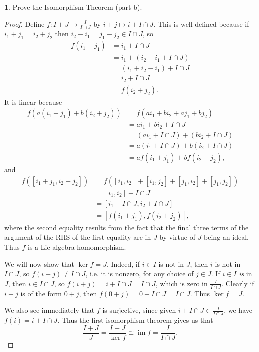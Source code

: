 \documentclass[12pt]{article}
\DeclareMathOperator{\im}{im}
\theoremstyle{definition}
\newtheorem{ex}{}
\begin{document}
\begin{ex}
	Prove the Isomorphism Theorem (part b).
\end{ex}
\begin{proof}
	Define $f : I + J \to \frac{I}{I \cap J}$ by $i + j \mapsto i + I \cap J$.
	This is well defined because if $i_1 + j_1 = i_2 + j_2$ then $i_2 - i_1 = j_1 - j_2 \in I \cap J$, so \begin{align*}
		f(i_1 + j_1) & = i_1 + I \cap J               \\
		             & = i_1 + (i_2 - i_1 + I \cap J) \\
		             & = (i_1 + i_2 - i_1) + I \cap J \\
		             & = i_2 + I \cap J               \\
		             & = f(i_2 + j_2).
	\end{align*}
	It is linear because \begin{align*}
		f(a(i_1 + j_1) + b(i_2 + j_2)) & = f(ai_1 + bi_2 + aj_1 + bj_2)          \\
		                               & = ai_1 + bi_2 + I \cap J                \\
		                               & = (ai_1 + I \cap J) + (bi_2 + I \cap J) \\
		                               & = a(i_1 + I \cap J) + b(i_2 + I \cap J) \\
		                               & = af(i_1 + j_1) + bf(i_2 + j_2),
	\end{align*}
	and \begin{align*}
		f([i_1 + j_1, i_2 + j_2]) & = f([i_1, i_2] + [i_1, j_2] + [j_1, i_2] + [j_1, j_2]) \\
		                          & = [i_1, i_2] + I \cap J                                \\
		                          & = [i_1 + I \cap J, i_2 + I \cap J]                     \\
		                          & = [f(i_1 + j_1), f(i_2 + j_2)],
	\end{align*}
	where the second equality results from the fact that the final three terms of the argument of the RHS of the first equality are in $J$ by virtue of $J$ being an ideal.
	Thus $f$ is a Lie algebra homomorphism.

	We will now show that $\ker f = J$.
	Indeed, if $i \in I$ is not in $J$, then $i$ is not in $I \cap J$, so $f(i + j) \neq I \cap J$, i.e. it is nonzero, for any choice of $j \in J$.
	If $i \in I$ \textit{is} in $J$, then $i \in I \cap J$, so $f(i + j) = i + I \cap J = I \cap J$, which is zero in $\frac{I}{I \cap J}$.
	Clearly if $i + j$ is of the form $0 + j$, then $f(0 + j) = 0 + I \cap J = I \cap J$.
	Thus $\ker f = J$.

	We also see immediately that $f$ is surjective, since given $i + I \cap J \in \frac{I}{I \cap J}$, we have $f(i) = i + I \cap J$.
	Thus the first isomorphism theorem gives us that \begin{equation*}
		\frac{I + J}{J} = \frac{I + J}{\ker f} \cong \im f = \frac{I}{I \cap J}.
	\end{equation*}
\end{proof}
\end{document}
